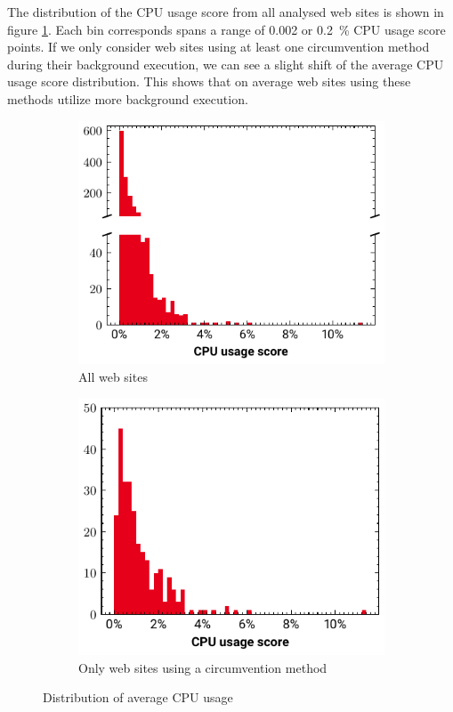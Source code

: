 \documentclass[
	ruledheaders=section,%
	class=report,%
	thesis={type=bachelor},%
	accentcolor=9c,%
	custommargins=true,%
	marginpar=false,%
	parskip=half-,%
	fontsize=11pt,%
]{tudapub}
\begin{document}
  The distribution of the CPU usage score from all analysed web sites is shown in figure \ref{fig:distribution-cpu-usage}. Each bin corresponds spans a range of 0.002 or 0.2~\% CPU usage score points. If we only consider web sites using at least one circumvention method during their background execution, we can see a slight shift of the average CPU usage score distribution. This shows that on average web sites using these methods utilize more background execution. 


  \begin{figure}
    \begin{subfigure}[t]{0.5\textwidth}
      \includegraphics[width=\textwidth]{images/histogram-global.pdf}
      \caption{All web sites}
    \end{subfigure}
    \hfill
    \begin{subfigure}[t]{0.5\textwidth}
      \includegraphics[width=\textwidth]{images/histogram-method.pdf}
      \caption{Only web sites using a circumvention method}
    \end{subfigure}

    \caption{Distribution of average CPU usage}
    \label{fig:distribution-cpu-usage}
  \end{figure}
  
\end{document}
